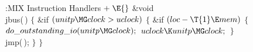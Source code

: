 \Y\B\4:MIX Instruction Handlers\X${}\mathrel+\E{}$\6
\&{void} \\{jbus}(\,)\1\1\2\2\6
${}\{{}$\1\6
\&{if} ${}(\\{unitp}\MG\\{clock}>\\{uclock}){}$\5
${}\{{}$\1\6
\&{if} ${}(\\{loc}-\T{1}\E\\{mem}){}$\5
${}\{{}$\1\6
${}\\{do\_outstanding\_io}(\\{unitp}\MG\\{clock});{}$\6
${}\\{uclock}\K\\{unitp}\MG\\{clock};{}$\6
\4${}\}{}$\2\6
\\{jmp}(\,);\6
\4${}\}{}$\2\6
\4${}\}{}$\2\par
\fi

